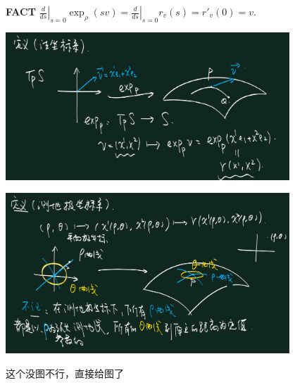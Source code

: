 \documentclass[lang=cn,10pt,thmcnt=section]{elegantbook}
\begin{document}
\textbf{FACT} \(\left. \frac{d}{ds} \right|_{s=0} \exp_{\rho}(sv) = \left. \frac{d}{ds} \right|_{s=0} r_v(s) = r'_v(0) = v\).





\includegraphics[width=0.8\textwidth]{figure/法坐标系.png}

\includegraphics[width=0.8\textwidth]{figure/测地坐标系.png}


这个没图不行，直接给图了
\end{document}
